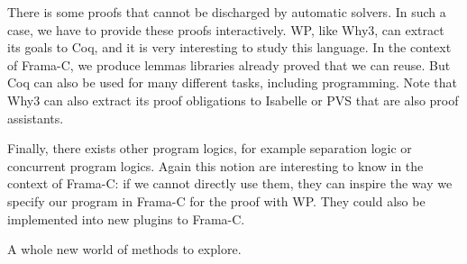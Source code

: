 \documentclass[12pt,francais,]{scrbook}
\begin{document}
There is some proofs that cannot be discharged by automatic solvers. In
such a case, we have to provide these proofs interactively. WP, like
Why3, can extract its goals to Coq, and it is very interesting to study
this language. In the context of Frama-C, we produce lemmas libraries
already proved that we can reuse. But Coq can also be used for many
different tasks, including programming. Note that Why3 can also extract
its proof obligations to Isabelle or PVS that are also proof assistants.

Finally, there exists other program logics, for example separation logic
or concurrent program logics. Again this notion are interesting to know
in the context of Frama-C: if we cannot directly use them, they can
inspire the way we specify our program in Frama-C for the proof with WP.
They could also be implemented into new plugins to Frama-C.

A whole new world of methods to explore.
\end{document}
